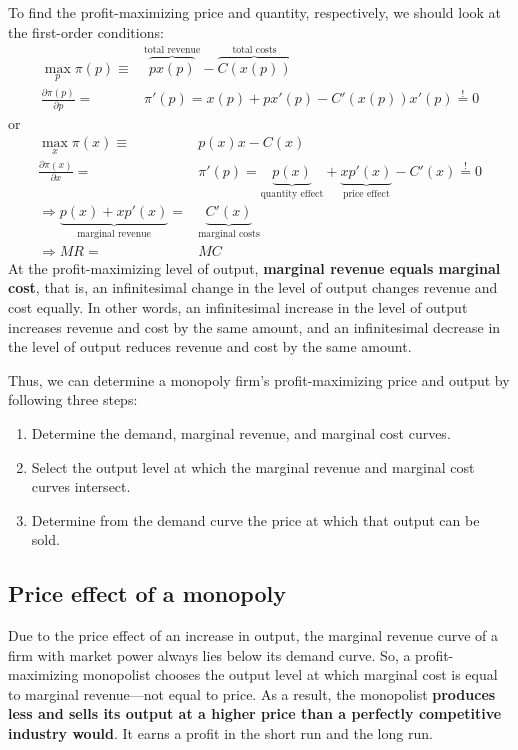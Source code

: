 To find the profit-maximizing price and quantity, respectively, we should look at the first-order conditions:
\begin{align*}
	\max_{p} \pi (p) \equiv &  \overbrace{px(p)}^{\text{total revenue}} -  \overbrace{C(x(p))}^{\text{total costs}}\\
	\frac{\partial \pi (p)}{\partial p} =& \pi ' (p) = x(p) + px'(p) - C'(x(p))x'(p) \overset{!}{=} 0
\end{align*}
or
\begin{align*}
	\max_{x} \pi (x) \equiv &  p(x)x - C(x)\\
	\frac{\partial \pi (x)}{\partial x} =& \pi ' (p) = \underbrace{p(x)}_{\text{quantity effect}} + \underbrace{xp'(x)}_{\text{price effect}} - C'(x) \overset{!}{=} 0\\
	\Rightarrow \underbrace{p(x) + xp'(x)}_{\text{marginal revenue}} =& \underbrace{C'(x)}_{\text{marginal costs}}\\
	\Rightarrow MR =& MC
\end{align*}
At the profit-maximizing level of output, \textbf{marginal revenue equals marginal cost}, that is, an infinitesimal change in the level of output changes revenue and cost equally. In other words, an infinitesimal increase in the level of output increases revenue and cost by the same amount, and an infinitesimal decrease in the level of output reduces revenue and cost by the same amount.

Thus, we can determine a monopoly firm's profit-maximizing price and output by following three steps:

\begin{enumerate}
	\item
	Determine the demand, marginal revenue, and marginal cost curves.
	\item
	Select the output level at which the marginal revenue and marginal cost curves intersect.
	\item
	Determine from the demand curve the price at which that output can be sold.
\end{enumerate}

\subsection{Price effect of a monopoly}\label{price-effect-of-a-monopoly}

Due to the price effect of an increase in output, the marginal revenue curve of a firm with market power always lies below its demand curve. So, a profit-maximizing monopolist chooses the output level at which marginal cost is equal to marginal revenue---not equal to price. As a result, the monopolist \textbf{produces less and sells its output at a higher price than a perfectly competitive industry would}. It earns a profit in the short run and the long run.

